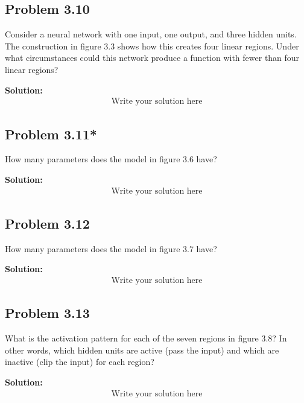 \documentclass{article}
\begin{document}
    \subsection*{Problem 3.10}
    Consider a neural network with one input, one output, and three hidden units. The construction in figure 3.3 shows how this creates four linear regions. Under what circumstances could this network produce a function with fewer than four linear regions?

        \vspace{1cm}
        \textbf{Solution:}
        \begin{align*}
            \text{Write your solution here}
        \end{align*}

    \subsection*{Problem 3.11*}
    How many parameters does the model in figure 3.6 have?

        \vspace{1cm}
        \textbf{Solution:}
        \begin{align*}
            \text{Write your solution here}
        \end{align*}

    \subsection*{Problem 3.12}
    How many parameters does the model in figure 3.7 have?

        \vspace{1cm}
        \textbf{Solution:}
        \begin{align*}
            \text{Write your solution here}
        \end{align*}

    \subsection*{Problem 3.13}
    What is the activation pattern for each of the seven regions in figure 3.8? In other words, which hidden units are active (pass the input) and which are inactive (clip the input) for each region?

        \vspace{1cm}
        \textbf{Solution:}
        \begin{align*}
            \text{Write your solution here}
        \end{align*}
\end{document}
